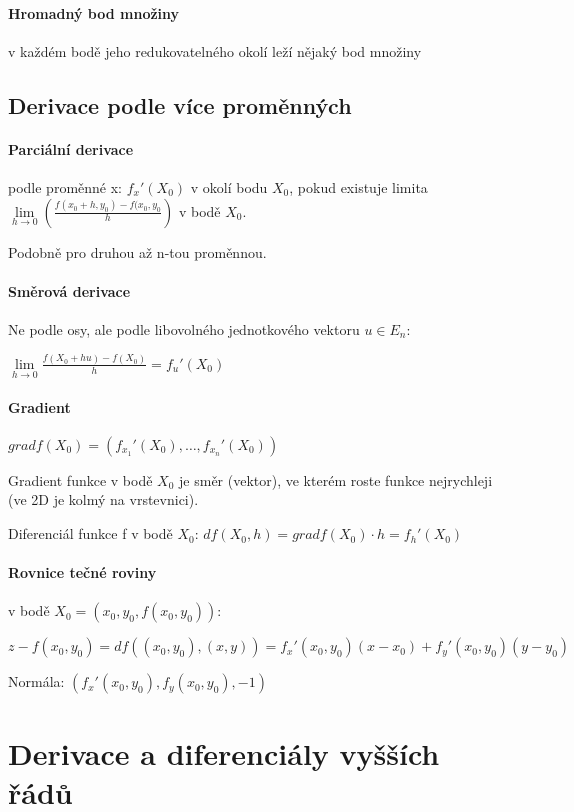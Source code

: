 \documentclass[a4paper, 11pt]{report}
\begin{document}
\paragraph{Hromadný bod množiny} v každém bodě jeho redukovatelného okolí leží nějaký bod množiny

\subsection{Derivace podle více proměnných}

\paragraph{Parciální derivace} podle proměnné x: $f_x'(X_0)$ v okolí bodu $X_0$, pokud existuje limita $\lim\limits_{h \to 0} \left( \frac{f(x_0 +h, y_0) - f(x_0, y_0}{h} \right)$ v bodě $X_0$.

Podobně pro druhou až n-tou proměnnou.

\paragraph{Směrová derivace} Ne podle osy, ale podle libovolného jednotkového vektoru $u \in E_n$:

$\lim\limits_{h \to 0} \frac{f(X_0 + h u) - f(X_0)}{h} = f_u'(X_0)$

\paragraph{Gradient} $grad f(X_0) = (f_{x_1}'(X_0), \dots, f_{x_n}'(X_0) )$

Gradient funkce v bodě $X_0$ je směr (vektor), ve kterém roste funkce nejrychleji (ve 2D je kolmý na vrstevnici).

Diferenciál funkce f v bodě $X_0$: $df(X_0, h) = gradf(X_0) \cdot h = f_h'(X_0)$

\paragraph{Rovnice tečné roviny} v bodě $X_0 = (x_0, y_0, f(x_0,y_0))$:

$z-f(x_0, y_0) = df((x_0, y_0), (x,y)) = f_x'(x_0, y_0)(x-x_0) + f_y'(x_0, y_0)(y-y_0)$ 

Normála: $(f_x'(x_0, y_0), f_y(x_0, y_0), -1)$

\section{Derivace a diferenciály vyšších řádů}
\end{document}
